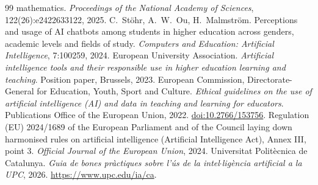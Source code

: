 \documentclass[11pt]{article}
\begin{document}
\begin{thebibliography}{99}
mathematics. \emph{Proceedings of the National Academy of Sciences}, 122(26):e2422633122,
2025.
 C.\ St\"ohr, A.\ W.\ Ou, H.\ Malmstr\"om. Perceptions and usage of AI
chatbots among students in higher education across genders, academic levels and fields of
study. \emph{Computers and Education: Artificial Intelligence}, 7:100259, 2024.
 European University Association. \emph{Artificial intelligence tools and
their responsible use in higher education learning and teaching}. Position paper,
Brussels, 2023.
 European Commission, Directorate-General for Education, Youth, Sport and
Culture. \emph{Ethical guidelines on the use of artificial intelligence (AI) and data in
teaching and learning for educators}. Publications Office of the European Union, 2022.
\href{https://data.europa.eu/doi/10.2766/153756}{doi:10.2766/153756}.
 Regulation (EU) 2024/1689 of the European Parliament and of the Council
laying down harmonised rules on artificial intelligence (Artificial Intelligence Act),
Annex III, point 3. \emph{Official Journal of the European Union}, 2024.
 Universitat Polit\`ecnica de Catalunya. \emph{Guia de bones pr\`actiques
sobre l'\'us de la intel$\cdot$lig\`encia artificial a la UPC}, 2026.
\url{https://www.upc.edu/ia/ca}.

\end{thebibliography}
\end{document}
